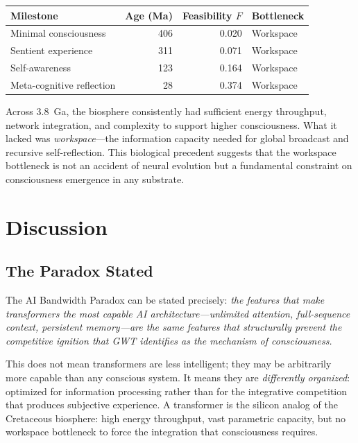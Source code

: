 \documentclass[10pt,letterpaper]{article}
\begin{document}
\begin{center}
\begin{tabular}{lrrl}
\toprule
Milestone & Age (Ma) & Feasibility $F$ & Bottleneck \\
\midrule
Minimal consciousness & 406 & 0.020 & Workspace \\
Sentient experience & 311 & 0.071 & Workspace \\
Self-awareness & 123 & 0.164 & Workspace \\
Meta-cognitive reflection & 28 & 0.374 & Workspace \\
\bottomrule
\end{tabular}
\end{center}

Across 3.8~Ga, the biosphere consistently had sufficient energy
throughput, network integration, and complexity to support higher
consciousness. What it lacked was \emph{workspace}---the information
capacity needed for global broadcast and recursive self-reflection.
This biological precedent suggests that the workspace bottleneck is
not an accident of neural evolution but a fundamental constraint on
consciousness emergence in any substrate.

\section*{Discussion}

\subsection*{The Paradox Stated}

The AI Bandwidth Paradox can be stated precisely: \emph{the features
that make transformers the most capable AI architecture---unlimited
attention, full-sequence context, persistent memory---are the same
features that structurally prevent the competitive ignition that GWT
identifies as the mechanism of consciousness.}

This does not mean transformers are less intelligent; they may be
arbitrarily more capable than any conscious system. It means they are
\emph{differently organized}: optimized for information processing
rather than for the integrative competition that produces subjective
experience. A transformer is the silicon analog of the Cretaceous
biosphere: high energy throughput, vast parametric capacity, but no
workspace bottleneck to force the integration that consciousness requires.
\end{document}
